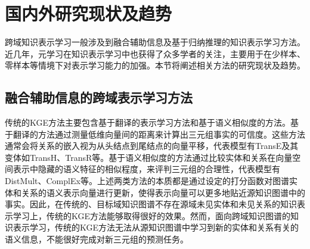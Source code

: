 

\section{国内外研究现状及趋势}
跨域知识表示学习一般涉及到融合辅助信息及基于归纳推理的知识表示学习方法。近几年，元学习在知识表示学习中也获得了众多学者的关注，主要用于在少样本、零样本等情境下对表示学习能力的加强。本节将阐述相关方法的研究现状及趋势。

\subsection{融合辅助信息的跨域表示学习方法}
传统的KGE方法主要包含基于翻译的表示学习方法和基于语义相似度的方法。基于翻译的方法通过测量低维向量间的距离来计算出三元组事实的可信度。这些方法通常会将关系的嵌入视为从头结点到尾结点的向量平移，代表模型有TransE\cite{bordes2013translating}及其变体如TransH\cite{wang2014knowledge}、TransR\cite{lin2015learning}等。基于语义相似度的方法通过比较实体和关系在向量空间表示中隐藏的语义特征的相似程度，来评判三元组的合理性，代表模型有DistMult\cite{yang2014embedding}、ComplEx\cite{trouillon2016complex}等。上述两类方法的本质都是通过设定的打分函数对图谱实体和关系的语义表示向量进行更新，使得表示向量可以更多地贴近源知识图谱中的事实。因此，在传统的、目标域知识图谱不存在源域未见实体和未见关系的知识表示学习上，传统的KGE方法能够取得很好的效果。然而，面向跨域知识图谱的知识表示学习，传统的KGE方法无法从源知识图谱中学习到新的实体和关系有关的语义信息，不能很好完成对新三元组的预测任务。

